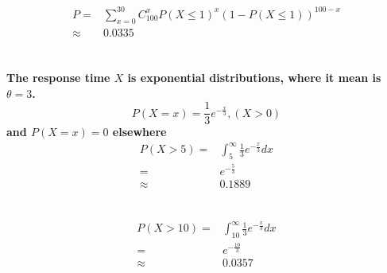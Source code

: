 \documentclass{article}
\begin{document}
        \subsection{}
            \paragraph{
                \begin{equation*}
                    \begin{split}
                        P=&\sum_{x=0}^{30}C_{100}^xP(X\leq 1)^x (1-P(X\leq 1))^{100-x}\\
                            \approx&0.0335
                    \end{split}
                \end{equation*}
            }
    \section{}
        \subsection{}
            \paragraph{
                The response time $X$ is exponential distributions, where it mean is $\theta=3$.
                $$P(X=x)=\frac{1}{3}e^{-\frac{x}{3}}, (X>0)$$
                and $P(X=x)=0$ elsewhere
                \begin{equation*}
                    \begin{split}
                        P(X>5)=&\int_{5}^{\infty}\frac{1}{3}e^{-\frac{x}{3}}dx\\
                            =&e^{-\frac{5}{3}}\\
                            \approx&0.1889\\
                    \end{split}
                \end{equation*}
            }
        \subsection{}
            \paragraph{
                \begin{equation*}
                    \begin{split}
                        P(X>10)=&\int_{10}^{\infty}\frac{1}{3}e^{-\frac{x}{3}}dx\\
                            =&e^{-\frac{10}{3}}\\
                            \approx&0.0357\\
                    \end{split}
                \end{equation*}
            }
\end{document}
